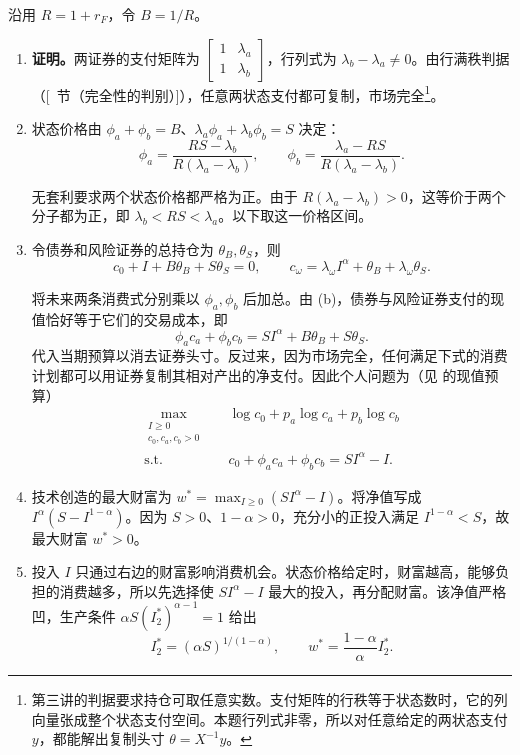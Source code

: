 \begin{solution}[blank-type=manual,blank-vsep=9\baselineskip]

沿用 $R=1+r_F$，令 $B=1/R$。
\begin{enumerate}[label=(\alph*)]
\item \textbf{证明。}两证券的支付矩阵为 $\begin{bmatrix}1&\lambda_a\\1&\lambda_b\end{bmatrix}$，行列式为 $\lambda_b-\lambda_a\ne0$。由行满秩判据\ifdefined\WJHandoutKnowledge（[~节（完全性的判别）]）\fi，任意两状态支付都可复制，市场完全\footnote{第三讲的判据要求持仓可取任意实数。支付矩阵的行秩等于状态数时，它的列向量张成整个状态支付空间。本题行列式非零，所以对任意给定的两状态支付 $y$，都能解出复制头寸 $\theta=X^{-1}y$。}。
\item 状态价格由 $\phi_a+\phi_b=B$、$\lambda_a\phi_a+\lambda_b\phi_b=S$ 决定：
\[
 \phi_a=\frac{RS-\lambda_b}{R(\lambda_a-\lambda_b)},\qquad
 \phi_b=\frac{\lambda_a-RS}{R(\lambda_a-\lambda_b)}.
\]

无套利要求两个状态价格都严格为正。由于 $R(\lambda_a-\lambda_b)>0$，这等价于两个分子都为正，即 $\lambda_b<RS<\lambda_a$。以下取这一价格区间。
\item 令债券和风险证券的总持仓为 $\theta_B,\theta_S$，则
\[
 c_0+I+B\theta_B+S\theta_S=0,\qquad
 c_\omega=\lambda_\omega I^\alpha+\theta_B+\lambda_\omega\theta_S.
\]

将未来两条消费式分别乘以 $\phi_a,\phi_b$ 后加总。由 (b)，债券与风险证券支付的现值恰好等于它们的交易成本，即
\[
 \phi_ac_a+\phi_bc_b=SI^\alpha+B\theta_B+S\theta_S .
\]
代入当期预算以消去证券头寸。反过来，因为市场完全，任何满足下式的消费计划都可以用证券复制其相对产出的净支付。因此个人问题为\ifdefined\WJHandoutKnowledge（见 的现值预算）\fi
\[
 \begin{aligned}
 \max_{\substack{I\ge0\\c_0,c_a,c_b>0}}\quad
   &\log c_0+p_a\log c_a+p_b\log c_b\\
 \text{s.t.}\quad &c_0+\phi_ac_a+\phi_bc_b=SI^\alpha-I.
 \end{aligned}
\]
\item 技术创造的最大财富为 $w^*=\max_{I\ge0}(SI^\alpha-I)$。将净值写成 $I^\alpha(S-I^{1-\alpha})$。因为 $S>0$、$1-\alpha>0$，充分小的正投入满足 $I^{1-\alpha}<S$，故最大财富 $w^*>0$。
\item 投入 $I$ 只通过右边的财富影响消费机会。状态价格给定时，财富越高，能够负担的消费越多，所以先选择使 $SI^\alpha-I$ 最大的投入，再分配财富。该净值严格凹，生产条件 $\alpha S(I_2^*)^{\alpha-1}=1$ 给出
\[
 I_2^*=(\alpha S)^{1/(1-\alpha)},\qquad w^*=\frac{1-\alpha}{\alpha}I_2^*.
\]


\end{enumerate}
\end{solution}
